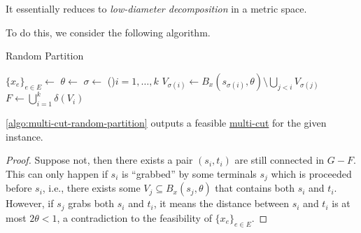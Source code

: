 \begin{intuition}
	It essentially reduces to \emph{low-diameter decomposition} in a metric space.
\end{intuition}

To do this, we consider the following algorithm.

\begin{algorithm}[H]\label{algo:multi-cut-random-partition}
	\DontPrintSemicolon{}
	\caption{Random Partition~\cite{calinescu2005approximation}}

	\BlankLine

	\(\{ x_e \} _{e\in E} \gets\)
	\(\theta \gets\)\uniform{\([0, 1 / 2)\)}\;
	\(\sigma \gets\)
	\For(){\(i = 1, \dots , k\)}{
		\(V_{\sigma (i)} \gets B_x(s_{\sigma (i)}, \theta ) \setminus \bigcup_{j < i} V_{\sigma (j)}\)\label{algo:multi-cut-random-partition-grab}\;
	}
	\(F \gets \bigcup_{i=1}^{k} \delta (V_i)\)\;
	\;
\end{algorithm}

\begin{lemma}\label{lma:multi-cut-random-partition-feasible}
	\autoref{algo:multi-cut-random-partition} outputs a feasible \hyperref[prb:multi-min-cut]{multi-cut} for the given instance.
\end{lemma}
\begin{proof}
	Suppose not, then there exists a pair \((s_i, t_i)\) are still connected in \(G - F\). This can only happen if \(s_i\) is ``grabbed'' by some terminals \(s_j\) which is proceeded before \(s_i\), i.e., there exists some \(V_j \subseteq B_x(s_j, \theta )\) that contains both \(s_i\) and \(t_i\). However, if \(s_j\) grabs both \(s_i\) and \(t_i\), it means the distance between \(s_i\) and \(t_i\) is at most \(2 \theta < 1\), a contradiction to the feasibility of \(\{ x_e \} _{e \in E}\).
\end{proof}

